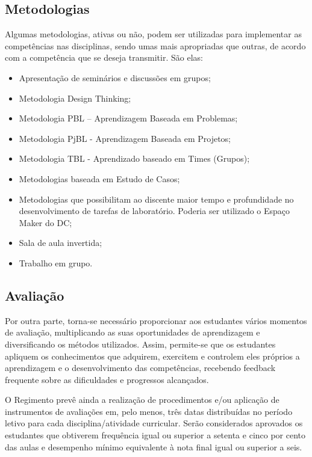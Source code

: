 \subsection{Metodologias}\label{sec:metodologias}
Algumas metodologias, ativas ou não, podem ser utilizadas para implementar as competências nas disciplinas, sendo umas mais apropriadas que outras, de acordo com a competência que se deseja transmitir. São elas:


\begin{itemize}
    \item Apresentação de seminários e discussões em grupos;
    \item Metodologia Design Thinking;
    \item Metodologia PBL – Aprendizagem Baseada em Problemas;
    \item Metodologia PjBL - Aprendizagem Baseada em Projetos;
    \item Metodologia TBL - Aprendizado baseado em Times (Grupos);
    \item Metodologias baseada em Estudo de Casos;
    \item Metodologias que possibilitam ao discente maior tempo e profundidade no desenvolvimento de tarefas de laboratório. Poderia ser utilizado o Espaço Maker do DC;
    \item Sala de aula invertida;
    \item Trabalho em grupo.
\end{itemize}

\subsection{Avaliação}\label{sec:avaliacao}

Por outra parte, torna-se necessário proporcionar aos estudantes vários momentos de avaliação, multiplicando as suas oportunidades de aprendizagem e diversificando os métodos utilizados. Assim, permite-se que os estudantes apliquem os conhecimentos que adquirem, exercitem e controlem eles próprios a aprendizagem e o desenvolvimento das competências, recebendo feedback frequente sobre as dificuldades e progressos alcançados.

O Regimento prevê ainda a realização de procedimentos e/ou aplicação de instrumentos de avaliações em, pelo menos, três datas distribuídas no período letivo para cada disciplina/atividade curricular. Serão considerados aprovados os estudantes que obtiverem frequência igual ou superior a setenta e cinco por cento das aulas e desempenho mínimo equivalente à nota final igual ou superior a seis.


